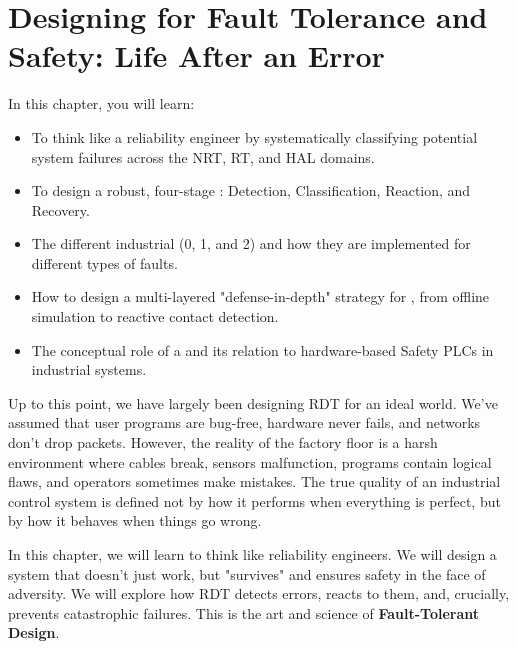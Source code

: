 
\chapter{Designing for Fault Tolerance and Safety: Life After an Error}
\label{chap:fault_tolerance_safety}


\begin{navigationbox}{In this chapter, you will learn:}
    \begin{itemize}
        \item To think like a reliability engineer by systematically classifying potential system failures across the NRT, RT, and HAL domains.
        \item To design a robust, four-stage : Detection, Classification, Reaction, and Recovery.
        \item The different industrial  (0, 1, and 2) and how they are implemented for different types of faults.
        \item How to design a multi-layered "defense-in-depth" strategy for , from offline simulation to reactive contact detection.
        \item The conceptual role of a  and its relation to hardware-based Safety PLCs in industrial systems.
    \end{itemize}
\end{navigationbox}


Up to this point, we have largely been designing RDT for an ideal world. We've assumed that user programs are bug-free, hardware never fails, and networks don't drop packets. However, the reality of the factory floor is a harsh environment where cables break, sensors malfunction, programs contain logical flaws, and operators sometimes make mistakes. The true quality of an industrial control system is defined not by how it performs when everything is perfect, but by how it behaves when things go wrong.

In this chapter, we will learn to think like reliability engineers. We will design a system that doesn't just work, but "survives" and ensures safety in the face of adversity. We will explore how RDT detects errors, reacts to them, and, crucially, prevents catastrophic failures. This is the art and science of \textbf{Fault-Tolerant Design}.

